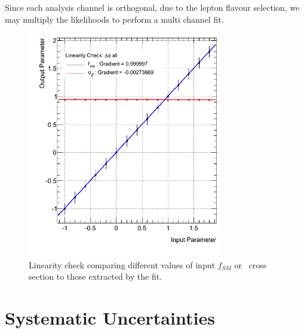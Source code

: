 Since each analysis channel is orthogonal, due to the lepton flavour selection, we may multiply the likelihoods to perform a multi channel fit. 

\begin{figure}[h!]
	\begin{center}
	\includegraphics[width=85mm]{f/delta_phi10all_syst_linLinearity}
	\end{center}
	\caption{Linearity check comparing different values of input $f_{SM}$ or \ttbar\ cross section to those extracted by the fit.}
	\label{fig:linearity}
\end{figure}

\section{Systematic Uncertainties}
\label{sec:systematics}


